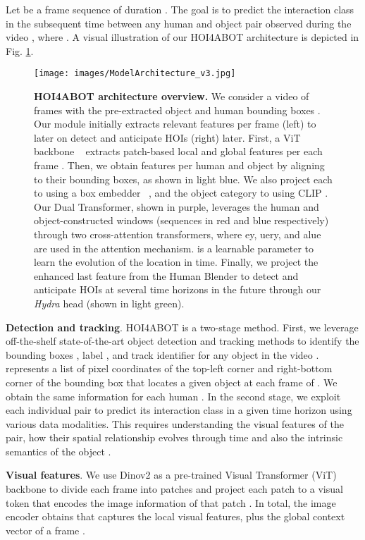 \documentclass{article}
\begin{document}
Let  be a frame sequence of duration . The goal is to predict the interaction class  in the subsequent time  between any human  and object  pair  observed during the video , where  .  A visual illustration of our HOI4ABOT architecture is depicted in Fig. \ref{fig:model_architecture}.

\begin{figure}
    \centering
    \texttt{[image: images/ModelArchitecture\_v3.jpg]}
    \caption{\textbf{HOI4ABOT architecture overview.} We consider a video of  frames with the pre-extracted object and human bounding boxes . Our module initially extracts relevant features per frame (left) to later on detect and anticipate HOIs (right) later. First, a ViT backbone ~\citep{oquab2023dinov2} extracts patch-based local  and global  features per each frame . Then, we obtain features per human  and object  by aligning  to their bounding boxes, as shown in light blue. We also project each  to  using a box embedder ~\citep{posembed_fourier}, and the object category to  using CLIP \citep{clip}. Our Dual Transformer, shown in purple, leverages the human and object-constructed windows (sequences in red and blue respectively) through two cross-attention transformers, where ey, uery, and alue are used in the attention mechanism.  is a learnable parameter to learn the evolution of the location in time. Finally, we project the enhanced last feature from the Human Blender to detect and anticipate HOIs at several time horizons  in the future through our \textit{Hydra} head (shown in light green).}
    \vspace{-5mm}
    \label{fig:model_architecture}
\end{figure}


\textbf{Detection and tracking}. HOI4ABOT is a two-stage method. First, we leverage off-the-shelf state-of-the-art object detection and tracking methods to identify the bounding boxes , label , and track identifier  for any object  in the video .  represents a list of  pixel coordinates of the top-left corner and right-bottom corner of the bounding box that locates a given object  at each frame  of . We obtain the same information for each human .   In the second stage, we exploit each individual pair  to predict its interaction class  in a given time horizon  using various data modalities. This requires understanding the visual features of the pair, how their spatial relationship evolves through time  and also the intrinsic semantics of the object .

\textbf{Visual features}. We use Dinov2 \citep{oquab2023dinov2} as a pre-trained Visual Transformer (ViT) \citep{dosovitskiy2020vit} backbone to divide each frame  into  patches and project each patch  to a visual token  that encodes the image information of that patch . In total, the image encoder obtains  that captures the local visual features, plus the global context vector  of a frame . 
\end{document}
